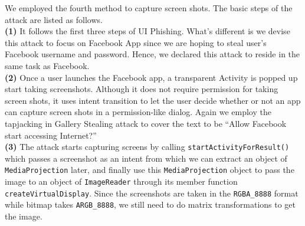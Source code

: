 \documentclass[letterpaper,12pt]{article}
\begin{document}
We employed the fourth method to capture screen shots. The basic steps
of the attack are listed as follows.\\ \textbf{(1)} It follows the
first three steps of UI Phishing. What's different is we devise this
attack to focus on Facebook App since we are hoping to steal user's
Facebook username and password. Hence, we declared this attack to
reside in the same task as Facebook.\\ \textbf{(2)} Once a user launches
the Facebook app, a transparent Activity is popped up start taking
screenshots. Although it does not require permission for taking screen
shots, it uses intent transition to let the user decide whether or not
an app can capture screen shots in a permission-like dialog. Again we
employ the tapjacking in Gallery Stealing attack to cover the text to
be ``Allow Facebook start accessing Internet?'' \\ \textbf{(3)} The
attack starts capturing screens by calling
\texttt{startActivityForResult()} which passes a screenshot as an
intent from which we can extract an object of \texttt{MediaProjection}
later, and finally use this \texttt{MediaProjection} object to pass
the image to an object of \texttt{ImageReader} through its member
function \texttt{createVirtualDisplay}. Since the screenshots are
taken in the \texttt{RGBA\_8888} format while bitmap takes
\texttt{ARGB\_8888}, we still need to do matrix transformations to
get the image.
\end{document}
